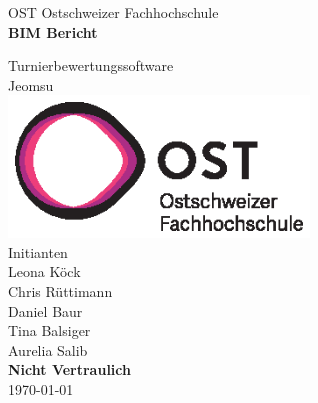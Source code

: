 \documentclass[10pt]{scrartcl}
\begin{document}
    \begin{titlepage}
        \begin{center}
        {\LARGE OST Ostschweizer Fachhochschule}
            \\[0.5cm]
            \linespread{1.2}\huge {\bfseries BIM Bericht}
            
            {\large{Turnierbewertungssoftware}}\\
            {\large{Jeomsu}}
            \\[1cm]
           \includegraphics[width=8cm]{images/ost_logo.eps}
           \\[1cm]
            {\small{Initianten}}\\
            {\Large{Leona Köck}}\\
            {\Large{Chris Rüttimann}}\\
            {\Large{Daniel Baur}}\\
            {\Large{Tina Balsiger}}\\
            {\Large{Aurelia Salib}}
            \\[1cm]
            {\Large{\textbf{Nicht Vertraulich}}}
            \\[1cm]
            \vspace*{\fill}
            \large{\today}
        \end{center}

    \end{titlepage}

    \addtocounter{section}{0}
	
	
\end{document}
